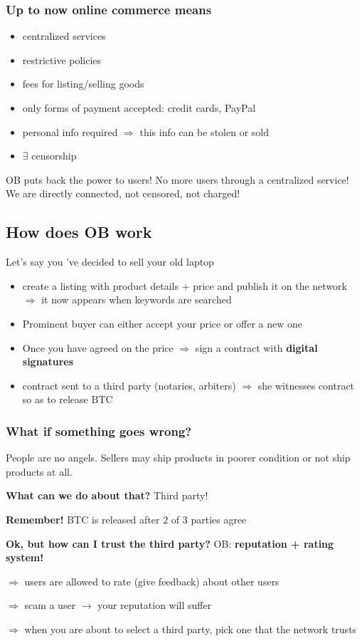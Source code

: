 \documentclass{beamer}
\begin{document}
\begin{frame}
\frametitle{Up to now online commerce means}
\begin{itemize}
\item centralized services \pause

\item restrictive policies\pause

\item fees for listing/selling goods\pause

\item only forms of payment accepted: credit cards, PayPal\pause

\item personal info required $\Rightarrow$ this info can be stolen or sold\pause

\item $\exists$ censorship
\end{itemize}\pause
OB puts back the power to users! No more users through a centralized service! We are directly connected, not censored, not charged!
\end{frame}
\subsection{How does OB work}
\begin{frame}
Let's say you 've decided to sell your old laptop
\begin{itemize}
\item create a listing with product details + price and publish it on the network $\Rightarrow$ it now appears when keywords are searched
\item Prominent buyer can either accept your price or offer a new one
\item Once you have agreed on the price $\Rightarrow$ sign a contract with {\bf digital signatures}
\item contract sent to a third party (notaries, arbiters) $\Rightarrow$ she witnesses contract so as to release BTC
\end{itemize}

\end{frame}
\begin{frame}
\frametitle{What if something goes wrong?}
People are no angels. Sellers may ship products in poorer condition or not ship products at all. \pause

{\bf What can we do about that?} \pause Third party! 

{\bf Remember!} BTC is released after  $2$ of $3$ parties agree

{\bf Ok, but how can I trust the third party?} \pause OB: {\bf reputation + rating system!}

$\Rightarrow$ users are allowed to rate (give feedback) about other users

$\Rightarrow$ scam a user $\rightarrow$ your reputation will suffer

$\Rightarrow$ when you are about to select a third party, pick one that the network trusts
\end{frame}
\end{document}
